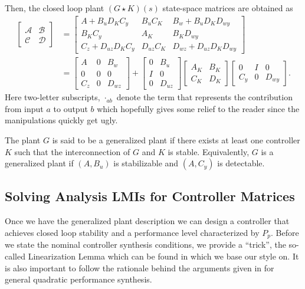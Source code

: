 Then, the closed loop plant $(G\star K)(s)$ state-space matrices are obtained as
\begin{align}
\left[\begin{array}{c|c}
\mathcal{A}	&\mathcal{B} \\\hline
\mathcal{C}	&\mathcal{D}
\end{array}
\right] &= \left[\begin{array}{cc|c}
A + B_uD_KC_y        & B_uC_K    & B_w + B_uD_KD_{wy} \\
B_KC_y               & A_K       & B_KD_{wy}\\ \hline
C_z +  D_{uz}D_KC_y  & D_{uz}C_K & D_{wz} + D_{uz}D_KD_{wy}
\end{array}\right] \\
&= \left[
\begin{array}{cc|c}
A   & 0  & B_w \\
0   & 0  & 0\\ \hline
C_z & 0  & D_{wz}
\end{array}
\right] + 
\left[
\begin{array}{cc}
0  & B_u \\
I  & 0\\ \hline
0  & D_{uz}
\end{array}
\right]
\left[
\begin{array}{cc}
A_K  & B_K \\
C_K  & D_K
\end{array}
\right]
\left[
\begin{array}{cc|c}
0   & I & 0\\
C_y & 0 & D_{wy}
\end{array}
\right].
\label{eq:nominalclinc}
\end{align}
Here two-letter subscripts, $\cdot_{ab}$ denote the term that represents the contribution from input $a$ to output $b$ which hopefully 
gives some relief to the reader since the manipulations quickly get ugly. 

\begin{define} The plant $G$ is said to be a generalized plant if there exists at least one controller 
$K$ such that the interconnection of $G$ and $K$ is stable. Equivalently, $G$ is a generalized plant if $(A,B_u)$ is stabilizable
and $(A,C_y)$ is detectable. 
\end{define}


\subsection{Solving Analysis LMIs for Controller Matrices}
Once we have the generalized plant description we can design a controller that achieves closed loop stability and a performance level 
characterized by $P_p$. Before we state the nominal controller synthesis conditions, we provide a \enquote{trick}, the so-called 
Linearization Lemma which can be found in \cite{lmibook99} which we base our style on. It is also important to follow the rationale 
behind the arguments given in \cite{scherermulti} for general quadratic performance synthesis.

